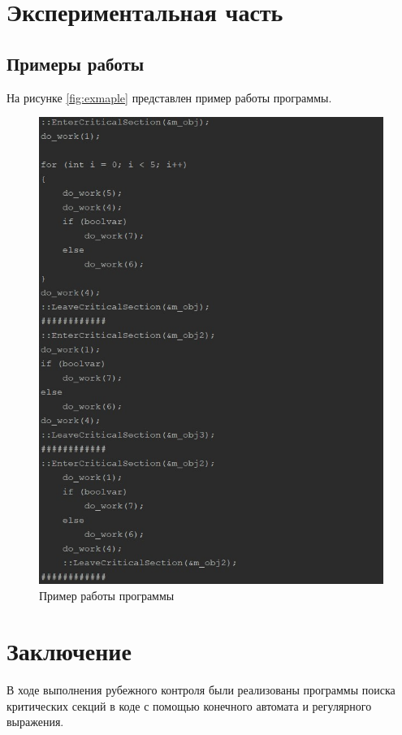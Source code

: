 \documentclass[12pt, a4paper]{report}
\begin{document}
	\newpage


	\chapter{Экспериментальная часть}
	\section{Примеры работы}
	\hspace{0.5cm}На рисунке \ref{fig:exmaple} представлен пример работы программы.
	\begin{figure}[ht!]
		\centering
		\includegraphics[width=1\linewidth]{example.jpg}
		\caption{Пример работы программы}
		\label{fig:example}
	\end{figure}

	\chapter*{Заключение}
	\hspace{0.5cm}В ходе выполнения рубежного контроля были реализованы программы поиска критических секций в коде с помощью конечного автомата и регулярного выражения.
	
\end{document}
